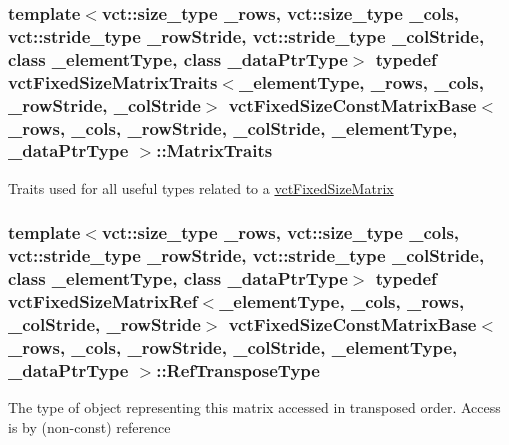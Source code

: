 \subsubsection[{Matrix\+Traits}]{\setlength{\rightskip}{0pt plus 5cm}template$<$vct\+::size\+\_\+type \+\_\+rows, vct\+::size\+\_\+type \+\_\+cols, vct\+::stride\+\_\+type \+\_\+row\+Stride, vct\+::stride\+\_\+type \+\_\+col\+Stride, class \+\_\+element\+Type, class \+\_\+data\+Ptr\+Type$>$ typedef {\bf vct\+Fixed\+Size\+Matrix\+Traits}$<$\+\_\+element\+Type, \+\_\+rows, \+\_\+cols, \+\_\+row\+Stride, \+\_\+col\+Stride$>$ {\bf vct\+Fixed\+Size\+Const\+Matrix\+Base}$<$ \+\_\+rows, \+\_\+cols, \+\_\+row\+Stride, \+\_\+col\+Stride, \+\_\+element\+Type, \+\_\+data\+Ptr\+Type $>$\+::{\bf Matrix\+Traits}}\label{classvct_fixed_size_const_matrix_base_a013c7db3c4e38c1573c29ee8ff40016f}
Traits used for all useful types related to a \hyperlink{classvct_fixed_size_matrix}{vct\+Fixed\+Size\+Matrix} \hypertarget{classvct_fixed_size_const_matrix_base_a8d6e7ad2cf2cd82aebbc3de0d6479dbe}{}
\subsubsection[{Ref\+Transpose\+Type}]{\setlength{\rightskip}{0pt plus 5cm}template$<$vct\+::size\+\_\+type \+\_\+rows, vct\+::size\+\_\+type \+\_\+cols, vct\+::stride\+\_\+type \+\_\+row\+Stride, vct\+::stride\+\_\+type \+\_\+col\+Stride, class \+\_\+element\+Type, class \+\_\+data\+Ptr\+Type$>$ typedef {\bf vct\+Fixed\+Size\+Matrix\+Ref}$<$\+\_\+element\+Type, \+\_\+cols, \+\_\+rows, \+\_\+col\+Stride, \+\_\+row\+Stride$>$ {\bf vct\+Fixed\+Size\+Const\+Matrix\+Base}$<$ \+\_\+rows, \+\_\+cols, \+\_\+row\+Stride, \+\_\+col\+Stride, \+\_\+element\+Type, \+\_\+data\+Ptr\+Type $>$\+::{\bf Ref\+Transpose\+Type}}\label{classvct_fixed_size_const_matrix_base_a8d6e7ad2cf2cd82aebbc3de0d6479dbe}
The type of object representing this matrix accessed in transposed order. Access is by (non-\/const) reference \hypertarget{classvct_fixed_size_const_matrix_base_a9745538b98120d767fe2b9a9ba984e80}{}
